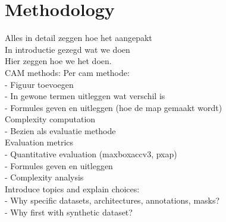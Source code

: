\chapter{Methodology} \label{ch:methodology}

Alles in detail zeggen hoe het aangepakt \\
In introductie gezegd wat we doen \\
Hier zeggen hoe we het doen. \\
CAM methods: Per cam methode: \\
- Figuur toevoegen \\
- In gewone termen uitleggen wat verschil is \\
- Formules geven en uitleggen (hoe de map gemaakt wordt) \\
Complexity computation \\
- Bezien als evaluatie methode \\
Evaluation metrics \\
- Quantitative evaluation (maxboxaccv3, pxap) \\
- Formules geven en uitleggen \\
- Complexity analysis \\

Introduce topics and explain choices:\\
- Why specific datasets, architectures, annotations, masks?\\
- Why first with synthetic dataset?\\


